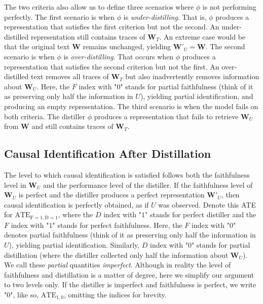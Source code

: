 \documentclass[11pt]{article}
\newcommand{\bW}{\bm{W}}  %
\begin{document}

The two criteria also allow us to define three scenarios where $\phi$ is not performing perfectly. The first scenario is when $\phi$ is \emph{under-distilling}. That is, $\phi$ produces a representation that satisfies the first criterion but not the second. An under-distilled representation still contains traces of $\bW_T$. An extreme case would be that the original text $\bm{W}$ remains unchanged, yielding $\bm{W'}_U=\bm{W}$. The second scenario is when $\phi$ is \emph{over-distilling}. That occurs when $\phi$ produces a representation that satisfies the second criterion but not the first. An over-distilled text removes all traces of $\bW_T$ but also inadvertently removes information about $\bW_U$. Here, the $F$ index with "$0$" stands for partial faithfulness  (think of it as preserving only half the information in $U$), yielding partial identification, and producing an empty representation. The third scenario is when the model fails on both criteria. The distiller $\phi$ produces a representation that fails to retrieve $\bW_U$ from $\bW$ and still contains traces of $\bm{W}_T$.

\subsection{Causal Identification After Distillation}

The level to which causal identification is satisfied follows both the faithfulness level in $\bW_U$ and the performance level of the distiller. If the faithfulness level of $\bW_U$ is perfect and the distiller produces a perfect representation $\bm{W'}_U$, then causal identification is perfectly obtained, as if $U$ was observed. Denote this ATE for $\textrm{ATE}_{\textrm{F}=1,\textrm{D}=1}$, where the $D$ index with "$1$" stands for perfect distiller and the $F$ index with "$1$" stands for perfect faithfulness. Here, the $F$ index with "$0$" denotes partial faithfulness (think of it as preserving only half the information in $U$), yielding partial identification. Similarly, $D$ index with "$0$" stands for partial distillation (where the distiller collected only half the information about $\bW_U$). We call these \textit{partial} quantities \textit{imperfect}. Although in reality the level of faithfulness and distillation is a matter of degree, here we simplify our argument to two levels only. If the distiller is imperfect and faithfulness is perfect, we write "$0$", like so, $\textrm{ATE}_{1,0}$, omitting the indices for brevity.
\end{document}
